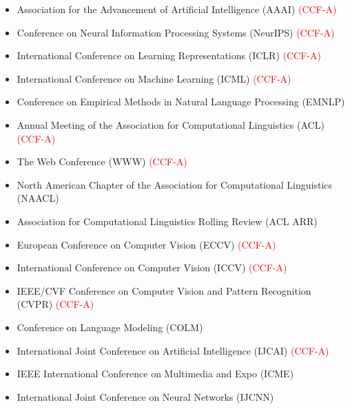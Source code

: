 \begin{itemize}
  \item Association for the Advancement of Artificial Intelligence (AAAI) \textcolor{red}{(CCF-A)}
  \item Conference on Neural Information Processing Systems (NeurIPS) \textcolor{red}{(CCF-A)}
  \item International Conference on Learning Representations (ICLR) \textcolor{red}{(CCF-A)}
  \item International Conference on Machine Learning (ICML) \textcolor{red}{(CCF-A)}
  \item Conference on Empirical Methods in Natural Language Processing (EMNLP)
  \item Annual Meeting of the Association for Computational Linguistics (ACL) \textcolor{red}{(CCF-A)}
  \item The Web Conference (WWW) \textcolor{red}{(CCF-A)}
  \item North American Chapter of the Association for Computational Linguistics (NAACL)
  \item Association for Computational Linguistics Rolling Review (ACL ARR)
  \item European Conference on Computer Vision (ECCV) \textcolor{red}{(CCF-A)}
  \item International Conference on Computer Vision (ICCV) \textcolor{red}{(CCF-A)}
  \item IEEE/CVF Conference on Computer Vision and Pattern Recognition (CVPR) \textcolor{red}{(CCF-A)}
  \item Conference on Language Modeling (COLM)
  \item International Joint Conference on Artificial Intelligence (IJCAI) \textcolor{red}{(CCF-A)}
  \item IEEE International Conference on Multimedia and Expo (ICME)
  \item International Joint Conference on Neural Networks (IJCNN)
\end{itemize}
